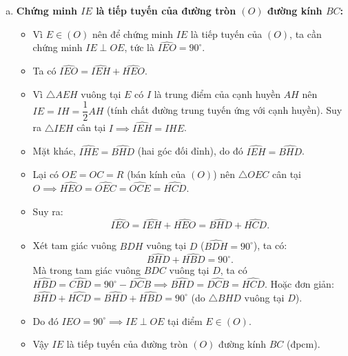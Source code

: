 \begin{ex}
{\begin{enumerate}[a)]
    \item \textbf{Chứng minh $IE$ là tiếp tuyến của đường tròn $(O)$ đường kính $BC$:}
    \begin{itemize}
        \item Vì $E \in (O)$ nên để chứng minh $IE$ là tiếp tuyến của $(O)$, ta cần chứng minh $IE \perp OE$, tức là $\widehat{IEO} = 90^\circ$.
        \item Ta có $\widehat{IEO} = \widehat{IEH} + \widehat{HEO}$.
        \item Vì $\triangle AEH$ vuông tại $E$ có $I$ là trung điểm của cạnh huyền $AH$ nên $IE = IH = \dfrac{1}{2}AH$ (tính chất đường trung tuyến ứng với cạnh huyền).
        Suy ra $\triangle IEH$ cân tại $I \implies \widehat{IEH} = \widehat{IHE}$.
        \item Mặt khác, $\widehat{IHE} = \widehat{BHD}$ (hai góc đối đỉnh), do đó $\widehat{IEH} = \widehat{BHD}$.
        \item Lại có $OE = OC = R$ (bán kính của $(O)$) nên $\triangle OEC$ cân tại $O \implies \widehat{HEO} = \widehat{OEC} = \widehat{OCE} = \widehat{HCD}$.
        \item Suy ra:
        \[
        \widehat{IEO} = \widehat{IEH} + \widehat{HEO} = \widehat{BHD} + \widehat{HCD}.
        \]
        \item Xét tam giác vuông $BDH$ vuông tại $D$ ($\widehat{BDH} = 90^\circ$), ta có:
        \[
        \widehat{BHD} + \widehat{HBD} = 90^\circ.
        \]
        Mà trong tam giác vuông $BDC$ vuông tại $D$, ta có $\widehat{HBD} = \widehat{CBD} = 90^\circ - \widehat{DCB} \implies \widehat{BHD} = \widehat{DCB} = \widehat{HCD}$.
        Hoặc đơn giản: $\widehat{BHD} + \widehat{HCD} = \widehat{BHD} + \widehat{HBD} = 90^\circ$ (do $\triangle BHD$ vuông tại $D$).
        \item Do đó $\widehat{IEO} = 90^\circ \implies IE \perp OE$ tại điểm $E \in (O)$.
        \item Vậy $IE$ là tiếp tuyến của đường tròn $(O)$ đường kính $BC$ (đpcm).
    \end{itemize}
\end{enumerate}
}
\end{ex}
